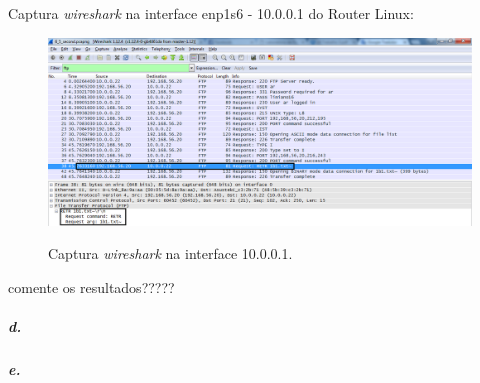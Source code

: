 Captura \emph{wireshark} na interface \textsf{enp1s6 - 10.0.0.1} do \textsf{Router Linux}:

\begin{figure}[h]
\centering
\includegraphics[width=1\textwidth, height=0.3\textheight]{5_b-enp1s6.png}
\label{fig:enp1s6}
\caption{Captura \emph{wireshark} na interface \textsf{10.0.0.1}.}
\end{figure}

comente os resultados?????


\subparagraph{d.}


\subparagraph{e.}

